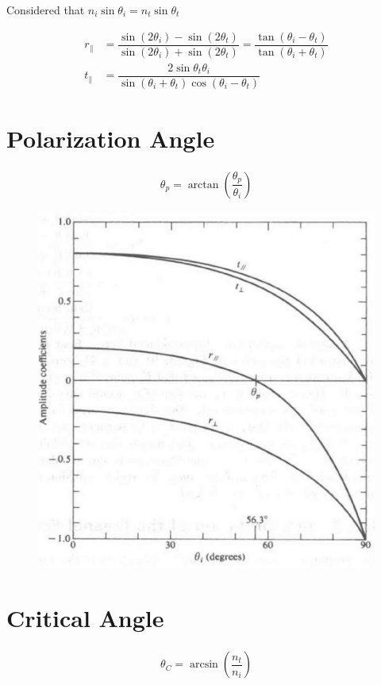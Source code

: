 Considered that $n_i \sin \theta_i = n_t \sin \theta_t$

\begin{equation*}
  \begin{aligned}
    r_{\parallel} &= \dfrac{\sin \left( 2 \theta_i \right) - \sin \left( 2 \theta_t \right)}{\sin \left( 2 \theta_i \right) + \sin \left( 2 \theta_t \right)} = \dfrac{\tan \left( \theta_i - \theta_t \right)}{\tan \left( \theta_i + \theta_t \right)} \\
    t_{\parallel} &= \dfrac{2 \sin \theta_t \theta_i}{\sin \left( \theta_i + \theta_t \right) \cos \left( \theta_i - \theta_t \right)} 
  \end{aligned}
\end{equation*}

\section{Polarization Angle}

\begin{equation*}
  \begin{aligned}
    \theta_p = \arctan \left( \dfrac{\theta_p}{\theta_i}  \right)
  \end{aligned}
\end{equation*}

\begin{figure}[H]
  \centering
  \includegraphics[width=0.3\linewidth]{figures/Polarization-angle}
  \label{fig:}
\end{figure}

\section{Critical Angle}

\begin{equation*}
  \begin{aligned}
    \theta_C = \arcsin \left( \dfrac{n_t}{n_i}  \right)
  \end{aligned}
\end{equation*}

